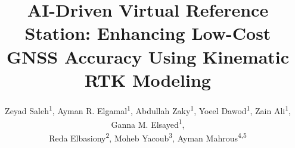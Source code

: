 \documentclass{isprs} %
\begin{document}
\title{	AI-Driven Virtual Reference Station: Enhancing Low-Cost GNSS Accuracy Using Kinematic RTK Modeling}
\date{}



\author{
Zeyad Saleh\textsuperscript{1}, Ayman R. Elgamal\textsuperscript{1}, Abdullah Zaky\textsuperscript{1}, Yoeel Dawod\textsuperscript{1}, Zain Ali\textsuperscript{1}, Ganna M. Elsayed\textsuperscript{1},\\
Reda Elbasiony\textsuperscript{2}, Moheb Yacoub\textsuperscript{3}, Ayman Mahrous\textsuperscript{4,5}
}



\address{
    \textsuperscript{1}Egypt-Japan University of Science and Technology (E-JUST), Department of Computer Science, Egypt\\
    \hspace{1em} Email: zeyad.youssef@ejust.edu.eg, ayman.elgamal@ejust.edu.eg, abdullah.zaky@ejust.edu.eg,\\
    \hspace{1em} yoel.dawod@ejust.edu.eg, zain.ali@ejust.edu.eg, ganna.elsayed@ejust.edu.eg\\
    
    \textsuperscript{2}Associate Professor, Egypt-Japan University of Science and Technology (E-JUST), Egypt\\
    \hspace{1em} Email: reda.elbasiony@ejust.edu.eg\\

    \textsuperscript{3}Doctoral Researcher at the University of Oulu, Finland\\
    \hspace{1em} Email: moheb.tawadrous@oulu.fi\\
    
    \textsuperscript{4}Department of Space Environment, Institute of Basic and Applied Sciences, Egypt-Japan University of Science and Technology (E-JUST)\\
    \textsuperscript{5}Department of Physics, Faculty of Science, Helwan University, Helwan 11795, Cairo, Egypt.\\
    \hspace{1em} Email: ayman.mahrous@ejust.edu.eg\\

}
\end{document}
